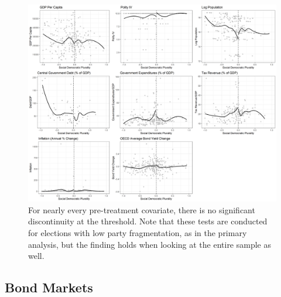 \documentclass[12pt]{article}
\begin{document}
\begin{figure}
\centering
\includegraphics[width=\linewidth]{figures/Figure3.png}
\caption{For nearly every pre-treatment covariate, there is no significant discontinuity at the threshold. Note that these tests are conducted for elections with low party fragmentation, as in the primary analysis, but the finding holds when looking at the entire sample as well.}
\label{fig:balanceplots}
\end{figure}

\subsection{Bond Markets}
\end{document}
